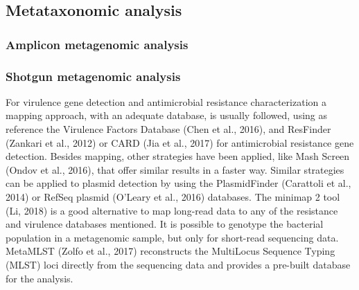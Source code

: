 \subsection{Metataxonomic analysis}

\subsubsection{Amplicon metagenomic analysis}

\subsubsection{Shotgun metagenomic analysis}




For virulence gene detection and antimicrobial resistance characterization a mapping approach, with an adequate database, is usually followed, using as reference the Virulence Factors Database (Chen et al., 2016), and ResFinder (Zankari et al., 2012) or CARD (Jia et al., 2017) for antimicrobial resistance gene detection. Besides mapping, other strategies have been applied, like Mash Screen (Ondov et al., 2016), that offer similar results in a faster way.  Similar strategies can be applied to plasmid detection by using the PlasmidFinder (Carattoli et al., 2014) or RefSeq plasmid (O’Leary et al., 2016) databases. The minimap 2 tool (Li, 2018) is a good alternative to map long-read data to any of the resistance and virulence databases mentioned. 
It is possible to genotype the bacterial population in a metagenomic sample, but only for short-read sequencing data.  MetaMLST (Zolfo et al., 2017) reconstructs the MultiLocus Sequence Typing (MLST) loci directly from the sequencing data and provides a pre-built database for the analysis.


